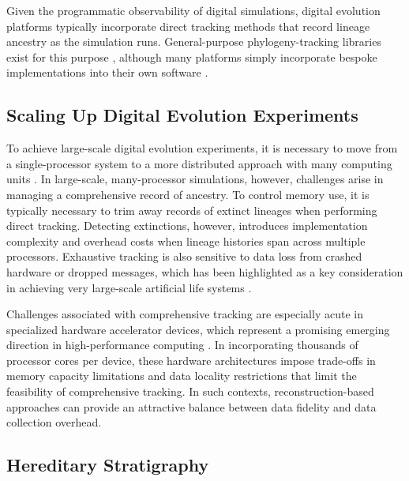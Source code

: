 Given the programmatic observability of digital simulations, digital evolution platforms typically incorporate direct tracking methods that record lineage ancestry as the simulation runs.
General-purpose phylogeny-tracking libraries exist for this purpose \citep{dolson2024phylotrack}, although many platforms simply incorporate bespoke implementations into their own software \citep{ofria2004avida}.

\subsection{Scaling Up Digital Evolution Experiments} \label{sec:introduction:distributed}

To achieve large-scale digital evolution experiments, it is necessary to move from a single-processor system to a more distributed approach with many computing units \citep{moreno2024trackable}.
In large-scale, many-processor simulations, however, challenges arise in managing a comprehensive record of ancestry.
To control memory use, it is typically necessary to trim away records of extinct lineages when performing direct tracking.
Detecting extinctions, however, introduces implementation complexity and overhead costs when lineage histories span across multiple processors.
Exhaustive tracking is also sensitive to data loss from crashed hardware or dropped messages, which has been highlighted as a key consideration in achieving very large-scale artificial life systems \citep{ackley2016indefinite,ackley2014indefinitely}.

Challenges associated with comprehensive tracking are especially acute in specialized hardware accelerator devices, which represent a promising emerging direction in high-performance computing \citep{emani2024democratizing}.
In incorporating thousands of processor cores per device, these hardware architectures impose trade-offs in memory capacity limitations and data locality restrictions that limit the feasibility of comprehensive tracking.
In such contexts, reconstruction-based approaches can provide an attractive balance between data fidelity and data collection overhead.

\subsection{Hereditary Stratigraphy} \label{sec:introduction:hstrat}



